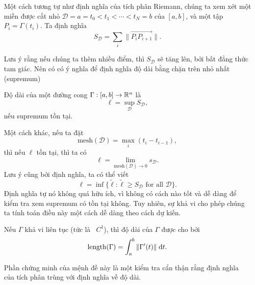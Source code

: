 Một cách tương tự như định nghĩa của tích phân Riemann, chúng ta xem xét một miền được cắt nhỏ $\mathcal{D} = a = t_0 < t_1 < \cdots < t_N = b$ của $[a, b]$, và một tập $P_i = \Gamma(t_i)$. Ta định nghĩa
\[
  S_\mathcal{D} = \sum_i \|\overrightarrow{P_i P_{i + 1}}\|.
\]
\begin{center}
\end{center}
Lưu ý rằng nếu chúng ta thêm nhiều điểm, thì $S_\mathcal{D}$ sẽ tăng lên, bởi bất đẳng thức tam giác. Nên có có ý nghĩa để định nghĩa độ dài bằng chặn trên nhỏ nhất (supremum)
\begin{defi}
  Độ dài của một đường cong $\Gamma: [a, b] \to \mathbb{R}^n$ là
  \[
    \ell = \sup_{\mathcal{D}} S_{\mathcal{D}},
  \]
  nếu supremum tồn tại.
\end{defi}
Một cách khác, nếu ta đặt
\[
  \mathrm{mesh}(\mathcal{D})= \max_i (t_i - t_{i - 1}),
\]
thì nếu $\ell$ tồn tại, thì ta có
\[
  \ell = \lim_{\mathrm{mesh}(\mathcal{D}) \to 0} s_{\mathcal{D}}.
\]
Lưu ý cũng bởi định nghĩa, ta có thể viết
\[
  \ell = \inf\{\tilde{\ell}: \tilde{\ell} \geq S_{\mathcal{D}}\text{ for all }\mathcal{D}\}.
\]
Định nghĩa tự nó không quá hữu ích, vì không có cách nào tốt và dễ dàng để kiểm tra xem supremum có tồn tại không. Tuy nhiên, sự khả vi cho phép chúng ta tính toán điều này một cách dễ dàng theo cách dự kiến.
\begin{prop}
  Nếu $\Gamma$ khả vi liên tục (tức là \ $C^1$), thì độ dài của $\Gamma$ được cho bởi
  \[
    \operatorname{length}(\Gamma) = \int_a^b \|\Gamma'(t)\|\;\mathrm{d} t.
  \]
\end{prop}
Phần chứng minh của mệnh đề này là một kiểm tra cẩn thận rằng định nghĩa của tích phân trùng với định nghĩa về độ dài.
